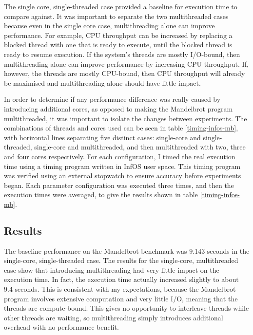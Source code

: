 \documentclass[bsc,frontabs,singlespacing,parskip,deptreport]{infthesis}     %
\begin{document}
The single core, single-threaded case provided a baseline for execution time to compare against. It was important to separate the two multithreaded cases because even in the single core case, multithreading alone can improve performance. For example, CPU throughput can be increased by replacing a blocked thread with one that is ready to execute, until the blocked thread is ready to resume execution. If the system's threads are mostly I/O-bound, then multithreading alone can improve performance by increasing CPU throughput. If, however, the threads are mostly CPU-bound, then CPU throughput will already be maximised and multithreading alone should have little impact. 

In order to determine if any performance difference was really caused by introducing additional cores, as opposed to making the Mandelbrot program multithreaded, it was important to isolate the changes between experiments. The combinations of threads and cores used can be seen in table \ref{timing-infos-mb}, with horizontal lines separating five distinct cases: single-core and single-threaded, single-core and multithreaded, and then multithreaded with two, three and four cores respectively. For each configuration, I timed the real execution time using a timing program written in InfOS user space. This timing program was verified using an external stopwatch to ensure accuracy before experiments began. Each parameter configuration was executed three times, and then the execution times were averaged, to give the results shown in table \ref{timing-infos-mb}.

\subsection{Results} \label{mb-benchmark-results}
The baseline performance on the Mandelbrot benchmark was 9.143 seconds in the single-core, single-threaded case. The results for the single-core, multithreaded case show that introducing multithreading had very little impact on the execution time. In fact, the execution time actually increased slightly to about 9.4 seconds. This is consistent with my expectations, because the Mandelbrot program involves extensive computation and very little I/O, meaning that the threads are compute-bound. This gives no opportunity to interleave threads while other threads are waiting, so multithreading simply introduces additional overhead with no performance benefit.
\end{document}
